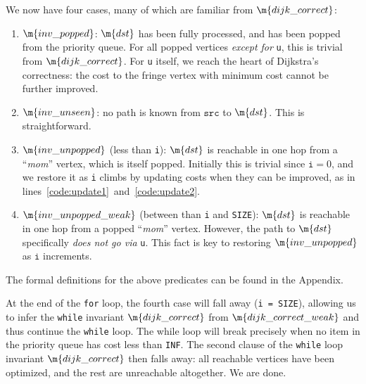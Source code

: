 We now have four cases, many of which are familiar from $\m{dijk\_correct}$:
\begin{enumerate}
\item $\m{inv\_popped}$: $\m{dst}$ has been fully processed, and has been
popped from the priority queue.  For all popped vertices \emph{except for} \texttt{u},
this is trivial from $\m{dijk\_correct}$. For \texttt{u} itself, we reach the heart of Dijkstra's correctness: the cost to the fringe vertex with minimum cost cannot be further improved.  %
\item $\m{inv\_unseen}$: no path is known from $\texttt{src}$ to $\m{dst}$.  This is straightforward.
\item $\m{inv\_unpopped}$ (less than \texttt{i}): $\m{dst}$ is reachable in
one hop from a ``\emph{mom}'' vertex, which is itself popped.  Initially this is trivial since $\texttt{i}=0$, and we restore it as \texttt{i} climbs by updating costs when they can be improved, as in lines~\ref{code:update1}~and~\ref{code:update2}.
\item $\m{inv\_unpopped\_weak}$ (between than \texttt{i} and \texttt{SIZE}):
$\m{dst}$ is reachable in one hop from a popped ``\emph{mom}'' vertex.
However, the path to $\m{dst}$ specifically \emph{does not go via} \texttt{u}.
This fact is key to restoring $\m{inv\_unpopped}$ as $\texttt{i}$
increments.
\end{enumerate}
The formal definitions for the above predicates can be found in the Appendix.

At the end of the \texttt{for} loop, the fourth case will fall away (\texttt{i = SIZE}),
allowing us to infer the \texttt{while} invariant $\m{dijk\_correct}$ from $\m{dijk\_correct\_weak}$ and thus continue the \texttt{while} loop.
The while loop will break precisely when no item in the priority queue has cost
less than \texttt{INF}. The second clause of the \texttt{while} loop invariant
$\m{dijk\_correct}$ then falls away: all reachable vertices have been optimized,
and the rest are unreachable altogether. We are done.

